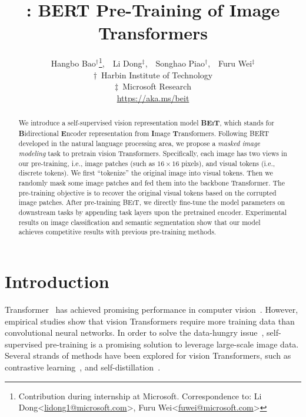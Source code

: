 \documentclass{article}
\title{\our{}: BERT Pre-Training of Image Transformers}
\author{%
Hangbo Bao$^\dag$\thanks{Contribution during internship at Microsoft. Correspondence to: Li Dong\textless{}\href{mailto:lidong1@microsoft.com}{lidong1@microsoft.com}\textgreater{}, Furu Wei\textless{}\href{mailto:fuwei@microsoft.com}{fuwei@microsoft.com}\textgreater{}},~~Li Dong$^\ddag$,~~Songhao Piao$^\dag$,~~Furu Wei$^\ddag$ \\
$\dag$~Harbin Institute of Technology \\
$\ddag$~Microsoft Research \\
\url{https://aka.ms/beit} \\
}
\newcommand\our{\textsc{BEiT}}
\begin{document}
\maketitle

\begin{abstract}
We introduce a self-supervised vision representation model \textbf{\our{}}, which stands for \textbf{B}idirectional \textbf{E}ncoder representation from \textbf{I}mage \textbf{T}ransformers. Following BERT~\citep{bert} developed in the natural language processing area, we propose a \textit{masked image modeling} task to pretrain vision Transformers. Specifically, each image has two views in our pre-training, i.e., image patches (such as $16 \times 16$ pixels), and visual tokens (i.e., discrete tokens). We first ``tokenize'' the original image into visual tokens. Then we randomly mask some image patches and fed them into the backbone Transformer. The pre-training objective is to recover the original visual tokens based on the corrupted image patches. After pre-training \our{}, we directly fine-tune the model parameters on downstream tasks by appending task layers upon the pretrained encoder. Experimental results on image classification and semantic segmentation show that our model achieves competitive results with previous pre-training methods.
\end{abstract}


\section{Introduction}
\label{sec:intro}

Transformer~\citep{transformer} has achieved promising performance in computer vision~\citep{vit,deit}.
However, empirical studies show that vision Transformers require more training data than convolutional neural networks.
In order to solve the data-hungry issue~\citep{vit:small:data}, self-supervised pre-training is a promising solution to leverage large-scale image data.
Several strands of methods have been explored for vision Transformers, such as contrastive learning~\citep{mocov3,swin:ssl}, and self-distillation~\citep{dino}.
\end{document}
